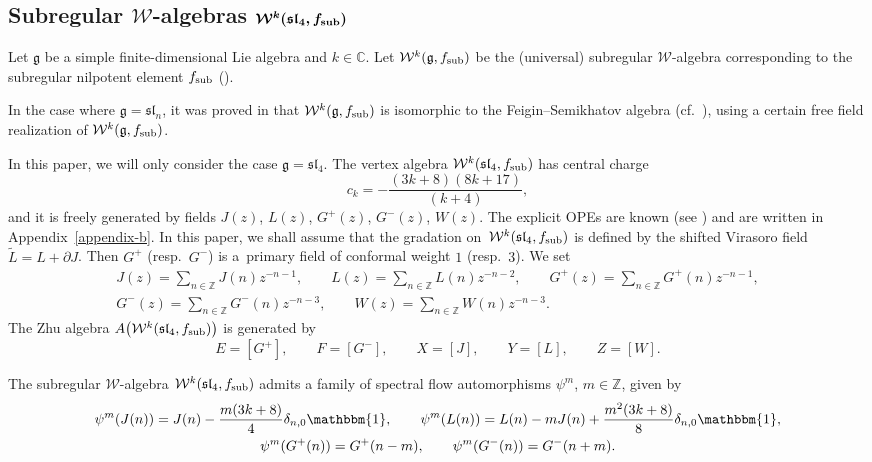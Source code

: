 \documentclass[pdftex]{sigma}
\numberwithin{equation}{section}
\newcommand{\Z}{\mathbb Z}
\begin{document}
\subsection[Subregular W-algebras W\^{}k(sl\_4, f\_sub]{Subregular $\boldsymbol{\mathcal{W}}$-algebras $\boldsymbol{\mathcal{W}^k(\mathfrak{sl}_4, f_{\rm sub})}$}	\label{subreg_ope}

Let $\mathfrak{g}$ be a simple finite-dimensional Lie algebra and $k \in \mathbb{C}$. Let $\mathcal{W}^k(\mathfrak{g}, f_{\rm sub})$ be the (universal) subregular $\mathcal{W}$-algebra corresponding to the subregular nilpotent element $f_{\rm sub}$ (\cite{KW}).

In the case where $\mathfrak g = \mathfrak{sl}_n$, it was proved in \cite{Gen} that $\mathcal{W}^k(\mathfrak{g}, f_{\rm sub})$ is isomorphic to the Feigin--Semikhatov algebra  (cf.\ \cite{FS}), using a certain free field realization of $\mathcal{W}^k(\mathfrak{g}, f_{\rm sub})$.

In this paper, we will only consider the case $\mathfrak g = \mathfrak{sl}_4$. The vertex algebra $\mathcal{W}^{k}(\mathfrak{sl}_4, f_{\rm sub})$ has central charge
\[
c_k = -\frac{(3k+8)(8k+17)}{(k+4) },
\]
 and it is freely generated by fields $J(z)$, $L(z)$, $G^+ (z)$, $G^- (z)$, $W(z)$. The explicit OPEs are known (see \cite{CL18,FS}) and are written in Appendix~\ref{appendix-b}. In this paper, we shall assume that the gradation on~$\mathcal{W}^{k}(\mathfrak{sl}_4, f_{\rm sub})$ is defined by the shifted Virasoro field $\widetilde L = L + \partial J$. Then $G^+$ (resp.~$G^-$) is a~primary field of conformal weight $1$ (resp.~$3$). We set
\begin{gather*}
J(z) = \sum _{n \in {\Z}} J(n) z^{-n-1}, \qquad L(z) = \sum _{n \in {\Z}} L(n) z^{-n-2}, \qquad G^+ (z) = \sum _{n \in {\Z}} G^+(n) z^{-n-1}, \\ G^- (z) = \sum _{n \in {\Z}} G^-(n) z^{-n-3}, \qquad W (z) = \sum _{n \in {\Z}} W(n) z^{-n-3}.
\end{gather*}	
The Zhu algebra $A\bigl(\mathcal{W}^{k}(\mathfrak{sl}_4, f_{\rm sub})\bigr)$ is generated by
\[
 E=[G^+],\qquad F=[G^- ], \qquad X=[J ], \qquad Y =[L], \qquad Z=[W].
 \]

The subregular $\mathcal{W}$-algebra $\mathcal{W}^k(\mathfrak{sl}_4, f_{\rm sub})$ admits a family of spectral flow automorphisms $\psi^m$, $m \in \mathbb{Z}$, given by
\begin{gather*}
 \psi^m (J(n)) = J(n)- { \frac{m (3 k +8)}{4} }
	 \delta _{n,0}\mathbbm{1} , \qquad \psi^m ( L(n)) = L(n) - mJ(n) + \frac{m^2 { (3k+8)}}{{8} }\delta _{n,0}\mathbbm{1}, \\
 \psi^m (G^+(n)) = G^+(n-m), \qquad \psi^m (G^-(n)) = G^-(n+m).
 \end{gather*}
\end{document}
